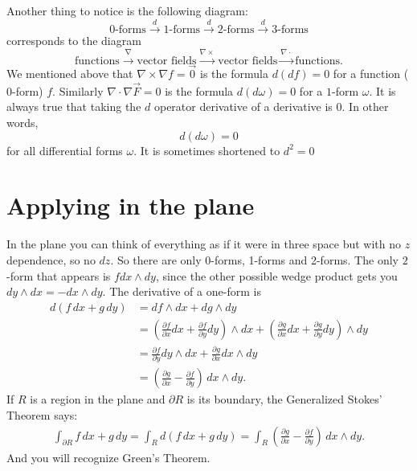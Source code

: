 \documentclass[12pt]{article}
\begin{document}
Another thing to notice is the following diagram:
\[
\text{0-forms} \overset{d}{\to}
\text{1-forms} \overset{d}{\to}
\text{2-forms} \overset{d}{\to}
\text{3-forms}
\]
corresponds to the diagram
\[
\text{functions} \overset{\nabla}{\to}
\text{vector fields} \overset{\nabla \times {}}{\to}
\text{vector fields} \overset{\nabla \cdot {}}{\to}
\text{functions} .
\]
We mentioned above that $\nabla \times \nabla f = \vec{0}$ is the formula $d(df) = 0$
for a function ($0$-form) $f$.
Similarly $\nabla \cdot \nabla \vec{F} = 0$ is the formula $d(d\omega) = 0$
for a $1$-form $\omega$.  It is always true that taking the $d$ operator derivative
of a derivative is $0$.  In other words,
\[
d(d\omega) = 0
\]
for all differential forms $\omega$.  It is sometimes shortened to $d^2 = 0$

\section*{Applying in the plane}

In the plane you can think of everything as if it were in three space but
with no $z$ dependence, so no $dz$.  So there are only 0-forms, 1-forms and 2-forms.
The only $2$-form that appears is $f dx \wedge dy$, since
the other possible wedge product gets you $dy \wedge dx = - dx \wedge dy$.
The derivative of a one-form is
\begin{equation*}
\begin{split}
d(f \, dx + g \, dy)
& =
df \wedge dx + dg \wedge dy
\\
& =
\left(\frac{\partial f}{\partial x} dx + \frac{\partial f}{\partial y} dy \right)  \wedge dx
+
\left(\frac{\partial g}{\partial x} dx + \frac{\partial g}{\partial y} dy \right)  \wedge dy
\\
& =
\frac{\partial f}{\partial y} dy \wedge dx
+
\frac{\partial g}{\partial x} dx  \wedge dy
\\
& =
\left(\frac{\partial g}{\partial x} -
\frac{\partial f}{\partial y} \right) \,dx  \wedge dy .
\end{split}
\end{equation*}
If $R$ is a region in the plane and $\partial R$ is its boundary, 
the Generalized Stokes' Theorem says:
\begin{equation*}
\begin{split}
\int_{\partial R}
f \, dx + g \, dy
=
\int_R 
d (f \, dx + g \, dy)
=
\int_R
\left(\frac{\partial g}{\partial x} -
\frac{\partial f}{\partial y} \right) \,dx  \wedge dy .
\end{split}
\end{equation*}
And you will recognize Green's Theorem.
\end{document}
